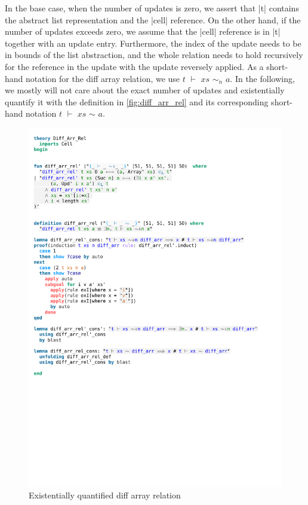 \noindent In the base case, when the number of updates is zero, we assert that |t| contains the abstract list representation and the |cell| reference. On the other hand, if the number of updates exceeds zero, we assume that the |cell| reference is in |t| together with an update entry. Furthermore, the index of the update needs to be in bounds of the list abstraction, and the whole relation needs to hold recursively for the reference in the update with the update reversely applied. As a short-hand notation for the diff array relation, we use $t$ $\vdash$ $xs$ $\sim_n$ $a$. In the following, we mostly will not care about the exact number of updates and existentially quantify it with the definition in \autoref{fig:diff_arr_rel} and its corresponding short-hand notation $t$ $\vdash$ $xs$ $\sim$ $a$.

\begin{figure}[htpb]
    \includegraphics[trim={0 21,2cm 0 7,4cm}, clip, width=1.00\textwidth]{figures/Theory_Diff_Arr_Rel.pdf}
    \caption[Existentially quantified diff array relation]{Existentially quantified diff array relation}
    \label{fig:diff_arr_rel}
\end{figure}

